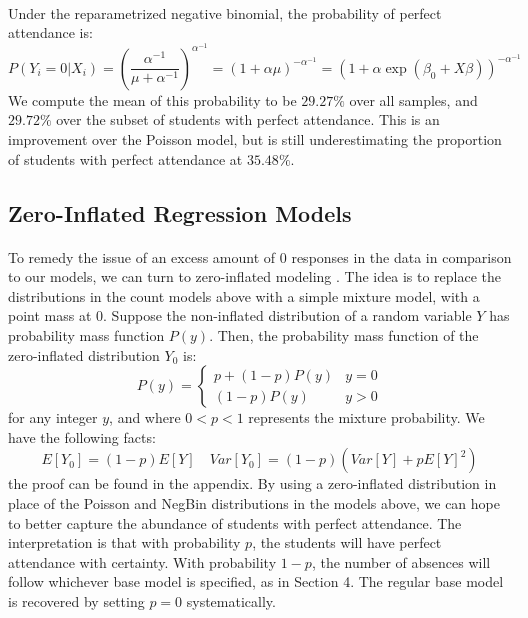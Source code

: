 \documentclass[12pt, titlepage]{article}
\begin{document}
	\paragraph{} Under the reparametrized negative binomial, the probability of perfect attendance is:
	$$
	P(Y_i = 0 | X_i) = \left(\frac{\alpha^{-1}}{\mu + \alpha^{-1}}\right)^{\alpha^{-1}}  = (1 + \alpha \mu)^{-\alpha^{-1}} = (1 + \alpha \exp(\beta_0 + X\beta))^{-\alpha^{-1}}
	$$
	We compute the mean of this probability to be $29.27\%$ over all samples, and $29.72\%$ over the subset of students with perfect attendance. This is an improvement over the Poisson model, but is still underestimating the proportion of students with perfect attendance at $35.48\%$. 
	
	\subsection{Zero-Inflated Regression Models}
	\paragraph{} To remedy the issue of an excess amount of $0$ responses in the data in comparison to our models, we can turn to zero-inflated modeling \cite{Hall::2004}. The idea is to replace the distributions in the count models above with a simple mixture model, with a point mass at $0$. Suppose the non-inflated distribution of a random variable $Y$ has probability mass function $P(y)$. Then, the probability mass function of the zero-inflated distribution $Y_0$ is:
	$$
	P(y) = \begin{cases}
	p + (1-p)P(y) & y = 0 \\
	(1 - p)P(y) & y > 0
	\end{cases}
	$$
	for any integer $y$, and where $0<p<1$ represents the mixture probability. We have the following facts:
	$$
	E[Y_0] = (1-p)E[Y] \quad Var[Y_0] = (1-p)(Var[Y] + pE[Y]^2)
	$$
	the proof can be found in the appendix. By using a zero-inflated distribution in place of the Poisson and NegBin distributions in the models above, we can hope to better capture the abundance of students with perfect attendance. The interpretation is that with probability $p$, the students will have perfect attendance with certainty. With probability $1-p$, the number of absences will follow whichever base model is specified, as in Section 4. The regular base model is recovered by setting $p=0$ systematically. 
	
\end{document}
